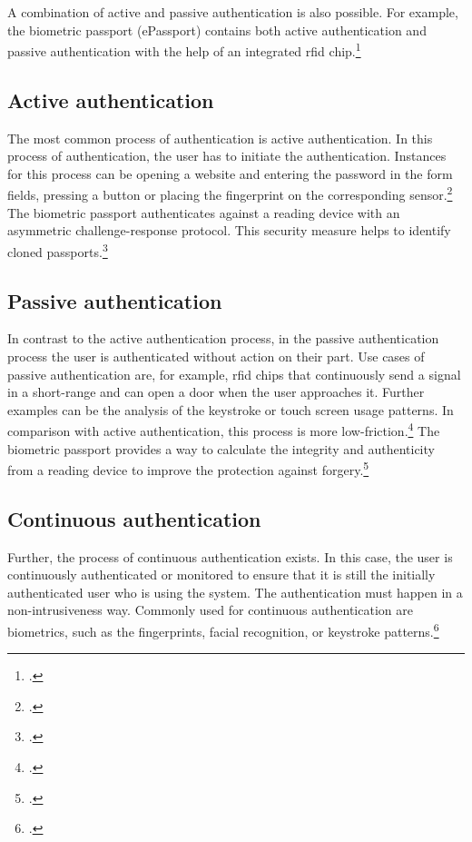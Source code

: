 A combination of active and passive authentication is also possible. For example, the biometric passport (\frqq ePassport\flqq) contains both active authentication and passive authentication with the help of an integrated \gls{rfid} chip.\footcite[See][545]{eckert-it-sec-9}


\subsection{Active authentication}
\label{subsec:active_auth}

The most common process of authentication is active authentication. In this process of authentication, the user has to initiate the authentication. Instances for this process can be opening a website and entering the password in the form fields, pressing a button or placing the fingerprint on the corresponding sensor.\footcites[See][185--186]{10.1007/978-3-319-05452-0_14} 
The biometric passport authenticates against a reading device with an asymmetric challenge-response protocol. This security measure helps to identify cloned passports.\footcite[See][545]{eckert-it-sec-9}

\subsection{Passive authentication}

In contrast to the active authentication process, in the passive authentication process the user is authenticated without action on their part. Use cases of passive authentication are, for example, \gls{rfid} chips that continuously send a signal in a short-range and can open a door when the user approaches it. Further examples can be the analysis of the keystroke or touch screen usage patterns. In comparison with active authentication, this process is more low-friction.\footcites[See][186]{10.1007/978-3-319-05452-0_14}[See][]{185306} The biometric passport provides a way to calculate the integrity and authenticity from a reading device to improve the protection against forgery.\footcite[See][545]{eckert-it-sec-9}

\subsection{Continuous authentication}

Further, the process of continuous authentication exists. In this case, the user is continuously authenticated or monitored to ensure that it is still the initially authenticated user who is using the system. The authentication must happen in a non-intrusiveness way. Commonly used for continuous authentication are biometrics, such as the fingerprints, facial recognition, or keystroke patterns.\footcites[See][236--238]{dasgupta2017multi}[See][]{7444124}


